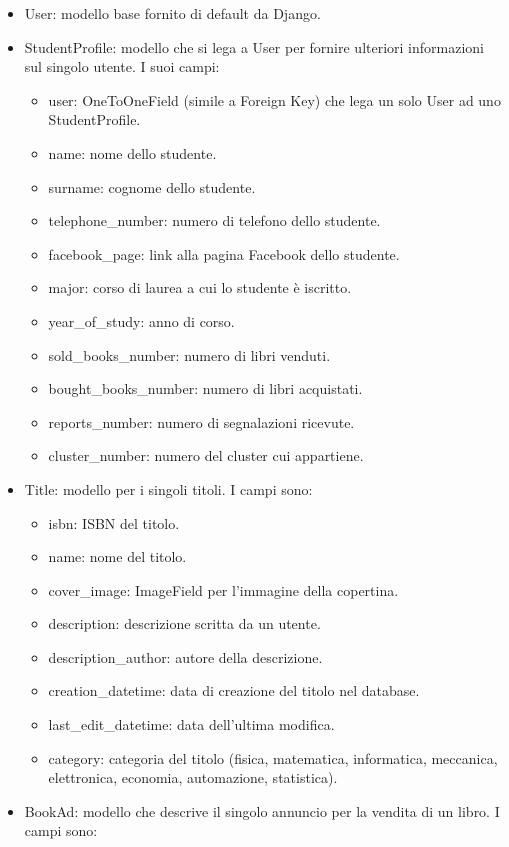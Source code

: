 \documentclass[10pt,a4paper]{report}
\begin{document}
	\begin{itemize}
		\item User: modello base fornito di default da Django. 
		\item StudentProfile: modello che si lega a User per fornire ulteriori informazioni sul singolo utente. I suoi campi:
		\begin{itemize}
			\item user: OneToOneField (simile a Foreign Key) che lega un solo User ad uno StudentProfile.
			\item name: nome dello studente.
			\item surname: cognome dello studente.
			\item telephone\_number: numero di telefono dello studente.
			\item facebook\_page: link alla pagina Facebook dello studente.
			\item major: corso di laurea a cui lo studente è iscritto.
			\item year\_of\_study: anno di corso.
			\item sold\_books\_number: numero di libri venduti.
			\item bought\_books\_number: numero di libri acquistati.
			\item reports\_number: numero di segnalazioni ricevute.
			\item cluster\_number: numero del cluster cui appartiene.
		\end{itemize}
		\item Title: modello per i singoli titoli. I campi sono:
			\begin{itemize}
				\item isbn: ISBN del titolo.
				\item name: nome del titolo.
				\item cover\_image: ImageField per l'immagine della copertina.
				\item description: descrizione scritta da un utente.
				\item description\_author: autore della descrizione.
				\item creation\_datetime: data di creazione del titolo nel database.
				\item last\_edit\_datetime: data dell'ultima modifica.
				\item category: categoria del titolo (fisica, matematica, informatica, meccanica, elettronica, economia, automazione, statistica).
			\end{itemize}
		\item BookAd: modello che descrive il singolo annuncio per la vendita di un libro. I campi sono:

\end{itemize}
\end{document}
